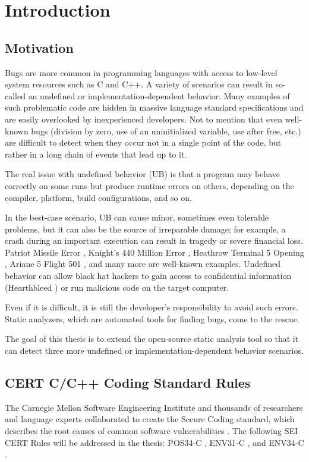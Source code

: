 \chapter{Introduction} %
\label{ch:intro}

\section{Motivation}

Bugs are more common in programming languages with access to low-level system resources such as C and C++.
A variety of scenarios can result in so-called an undefined or implementation-dependent behavior.
Many examples of such problematic code are hidden in massive language standard specifications and are easily overlooked by inexperienced developers. Not to mention that even well-known bugs (division by zero, use of an uninitialized variable, use after free, etc.) are difficult to detect when they occur not in a single point of the code, but rather in a long chain of events that lead up to it. 

The real issue with undefined behavior (UB) is that a program may behave correctly on some runs but produce runtime errors on others, depending on the compiler, platform, build configurations, and so on. 

In the best-case scenario, UB can cause minor, sometimes even tolerable problems, but it can also be the source of irreparable damage; for example, a crash during an important execution can result in tragedy or severe financial loss.
Patriot Missile Error \cite{patriotmissle}, Knight's 440 Million Error \cite{knight}, Heathrow Terminal 5 Opening \cite{heathrow}, Ariane 5 Flight 501 \cite{ariane}, and many more are well-known examples. Undefined behavior can allow black hat hackers to gain access to confidential information (Hearthbleed \cite{heartbleed}) or run malicious code on the target computer. 

Even if it is difficult, it is still the developer's responsibility to avoid such errors.
Static analyzers, which are automated tools for finding bugs, come to the rescue. 

The goal of this thesis is to extend the open-source static analysis tool so that it can detect three more undefined or implementation-dependent behavior scenarios. 




\section{CERT C/C++ Coding Standard Rules} \label{rules}
The Carnegie Mellon Software Engineering Institute and thousands of researchers and language experts collaborated to create the Secure Coding standard, which describes the root causes of common software vulnerabilities \cite{seicertc} \cite{seicertcpp}.
The following SEI CERT Rules will be addressed in the thesis:
POS34-C \cite{pos34}, ENV31-C \cite{env31}, and ENV34-C \cite{env34}. 

